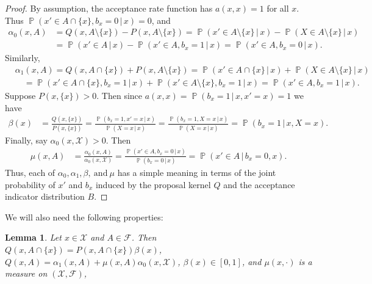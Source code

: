 \documentclass[aihp]{imsart}
\theoremstyle{plain}
\newtheorem{lemma}[theorem]{Lemma}
\theoremstyle{remark}
\theoremstyle{definition} \newtheorem{example}{Example}
\newcommand{\eq}[1]{\begin{align*}#1\end{align*}} %
\renewcommand{\P}{\operatorname{\mathbb{P}}}
\newcommand{\scrF}{\mathscr{F}}
\newcommand{\calX}{\mathcal{X}}
\newcommand{\g}{\, | \,}
\newcommand{\sas}{\ \text{and} \ }
\newcommand{\sm}{\setminus}
\newcommand{\sx}{\{ x \}}
\begin{document}
\begin{proof}
By assumption, the acceptance rate function has $a(x,x)=1$ for all $x$.
Thus $\P(x' \in A \cap \sx, b_x = 0 \g x) = 0$, and
\eq{
	\alpha_0(x,A)
	&= Q(x, A \sm \sx) - P(x, A \sm \sx)
	= \P(x' \in A \sm \sx \g x) - \P(X \in A \sm \sx \g x) \\
	&= \P(x' \in A \g x ) - \P(x' \in A, b_x=1 \g x)
	= \P(x' \in A, b_x=0 \g x).
}
Similarly,
\eq{
	& \alpha_1(x,A)
	= Q(x, A \cap \sx) + P(x, A \sm \sx)
	= \P(x' \in A \cap \sx \g x ) + \P(X \in A \sm \sx \g x) \\
	& \quad = \P(x' \in A \cap \sx, b_x=1 \g x ) + \P(x' \in A \sm \sx, b_x=1 \g x)
	= \P(x' \in A, b_x=1 \g x ).
}
Suppose $P(x, \sx) > 0$. Then since $a(x, x) = \P(b_x = 1 \g x, x' = x) = 1$ we have
\eq{
	\beta(x)
	& = \frac{Q(x, \sx)}{P(x, \sx)}
	= \frac{\P(b_x = 1, x'=x \g x ) }{\P(X = x \g x)}
	= \frac{\P(b_x = 1, X=x \g x) }{\P(X = x \g x)}
	= \P(b_x = 1 \g x, X=x).
}
Finally, say $\alpha_0(x, \calX) > 0$. Then
\eq{
	\mu(x,A)
	& = \frac{\alpha_0(x, A)}{\alpha_0(x, \calX)}
	= \frac{ \P(x' \in A, b_x = 0 \g x)}{ \P(b_x = 0 \g x)} = \P(x' \in A \g b_x = 0, x).
}
Thus, each of $\alpha_0, \alpha_1, \beta, \sas \mu$ has a simple meaning in terms of the joint
probability of $x'$ and $b_x$ induced by the proposal kernel $Q$ and the acceptance indicator
distribution $B$.
\end{proof}

We will also need the following properties:

\smallskip

\begin{lemma}
\label{lem:identities}
Let $x \in \calX$ and $A \in \scrF$.
Then
${Q(x, A \cap \sx) \! = \! P(x, A \cap \sx) \beta(x)}$,
${Q(x, A) \! = \! \alpha_1(x, A) + \mu(x, A) \alpha_0(x, \calX)}$,
$\beta(x) \in [0,1]$, and
$\mu(x, \cdot)$ is a measure on $(\calX, \scrF)$,
\end{lemma}
\end{document}
